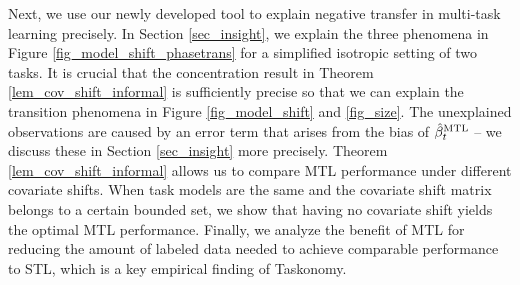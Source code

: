 
Next, we use our newly developed tool to explain negative transfer in multi-task learning precisely.
In Section \ref{sec_insight}, we explain the three phenomena in Figure \ref{fig_model_shift_phasetrans} for a simplified isotropic setting of two tasks.
It is crucial that the concentration result in Theorem \ref{lem_cov_shift_informal} is sufficiently precise so that we can explain the transition phenomena in Figure \ref{fig_model_shift} and \ref{fig_size}.
The unexplained observations are caused by an error term that arises from the bias of $\hat{\beta}_t^{\text{MTL}}$ -- we discuss these in Section \ref{sec_insight} more precisely.
Theorem \ref{lem_cov_shift_informal} allows us to compare MTL performance under different covariate shifts.
When task models are the same and the covariate shift matrix belongs to a certain bounded set, we show that having no covariate shift yields the optimal MTL performance.
Finally, we analyze the benefit of MTL for reducing the amount of labeled data needed to achieve comparable performance to STL, which is a key empirical finding of Taskonomy.

